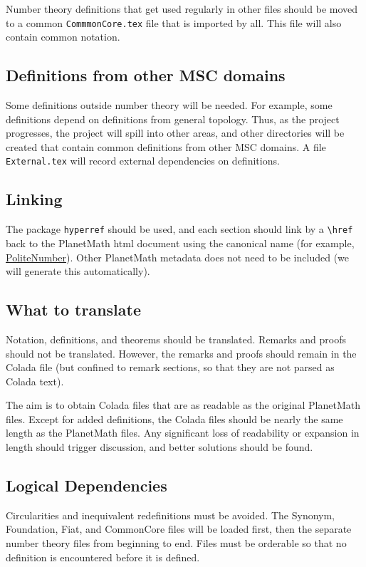 \documentclass[12pt]{article}
\numberwithin{definition}{section}
\begin{document}
  Number theory definitions that get used regularly in other files should be
  moved to a common {\tt CommmonCore.tex} file that is imported by
  all.  This file will also contain common notation.
  


\subsection{Definitions from other MSC domains}

Some definitions outside number theory will be needed.  For example,
some definitions depend on definitions from general topology.  
Thus, as the project progresses, the project will spill into other areas, 
and other directories will be created that
contain common definitions from other MSC domains.  A file {\tt External.tex}
will record external dependencies on definitions.

\subsection{Linking} The package {\tt hyperref} should be used, and each section should
  link by a \verb!\href! back to the PlanetMath html document using
  the canonical name (for example,
  \href{https://planetmath.org/PoliteNumber}{PoliteNumber}).  Other PlanetMath metadata does not
  need to be included (we will generate this automatically).
  


\subsection{What to translate} 
Notation, definitions, and theorems should be translated.
Remarks and proofs should not  be translated.   However, the
remarks and proofs should remain in the Colada file (but confined
to remark sections, so that they are not parsed as Colada text).

The aim is to obtain Colada files that are as readable as the original
PlanetMath files.  Except for added definitions, the Colada files
should be nearly the same length as the PlanetMath files.
Any significant loss of readability or expansion in length should 
trigger discussion, and better solutions should be found.

\subsection{Logical Dependencies} 
Circularities and inequivalent redefinitions must be avoided.  
The Synonym, Foundation, Fiat, and CommonCore files will be
loaded first, then the separate
number theory files from beginning to end.  Files must be orderable so
that no definition is encountered before it is defined.
\end{document}
